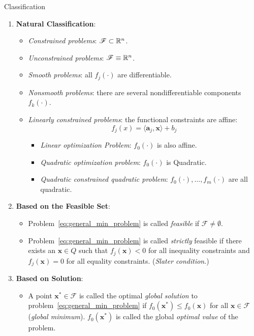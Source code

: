 \begin{note}{Classification}
    \begin{enumerate}
        \item \textbf{Natural Classification}:
            \begin{itemize}
                \item \emph{Constrained problems}: \(\mathscr{F} \subset \mathbb{R}^n\).
                \item \emph{Unconstrained problems}: \(\mathscr{F} \equiv \mathbb{R}^n\).
                \item \emph{Smooth problems}: all \(f_j(\cdot)\) are differentiable.
                \item \emph{Nonsmooth problems}: there are several nondifferentiable components \(f_k(\cdot)\).
                \item \emph{Linearly constrained problems}: the functional constraints are affine:
                    \[
                            f_j(x) = \langle \bm{a}_j, \bm{x} \rangle + b_j
                    \]
                    \begin{itemize}
                        \item \emph{Linear optimization Problem}: \(f_0(\cdot)\) is also affine.
                        \item \emph{Quadratic optimization problem}: \(f_0(\cdot)\) is Quadratic.
                        \item \emph{Quadratic constrained quadratic problem}: \(f_0(\cdot), \dots, f_m(\cdot)\) are all quadratic.
                    \end{itemize}
            \end{itemize}
        \item \textbf{Based on the Feasible Set}:
            \begin{itemize}
                \item Problem~\ref{eq:general_min_problem} is called \emph{feasible} if \(\mathscr{F} \ne \emptyset\).
                \item Problem~\ref{eq:general_min_problem} is called \emph{strictly} feasible if there exists an \(\bm{x} \in Q\) such that \(f_j(\bm{x}) < 0\) for all inequality constraints and \(f_j(\bm{x}) = 0\) for all equality constraints. (\textit{Slater condition}.)
            \end{itemize}
        \item \textbf{Based on Solution}:
            \begin{itemize}
                \item A point \(\bm{x}^* \in \mathscr{F}\) is called the optimal \emph{global solution} to problem~\ref{eq:general_min_problem} if \(f_0(\bm{x}^*) \le f_0(\bm{x})\) for all \(\bm{x} \in \mathscr{F}\) (\textit{global minimum}). \(f_0(\bm{x}^*)\) is called the global \emph{optimal value} of the problem.

\end{itemize}
\end{enumerate}
\end{note}
